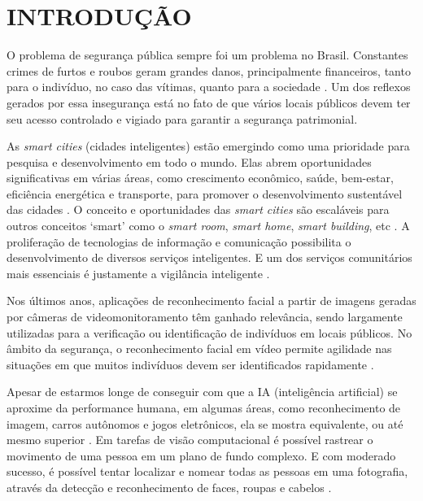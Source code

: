 \chapter{\MakeUppercase{Introdução}}
\label{chap:intro}
\thispagestyle{plain}

\vspace{-3em} %

O problema de segurança pública sempre foi um problema no Brasil. Constantes crimes de furtos e roubos geram grandes danos, principalmente financeiros, tanto para o indivíduo, no caso das vítimas, quanto para a sociedade \cite{Cerqueira2007, G12013}. Um dos reflexos gerados por essa insegurança está no fato de que vários locais públicos devem ter seu acesso controlado e vigiado para garantir a segurança patrimonial.

As \textit{smart cities} (cidades inteligentes) estão emergindo como uma prioridade para pesquisa e desenvolvimento em todo o mundo. Elas abrem oportunidades significativas em várias áreas, como crescimento econômico, saúde, bem-estar, eficiência energética e transporte, para promover o desenvolvimento sustentável das cidades \cite{Song2017}. O conceito e oportunidades das \textit{smart cities} são escaláveis para outros conceitos ‘smart’ como o \textit{smart room}, \textit{smart home}, \textit{smart building}, etc \cite{Pacheco2018}. A proliferação de tecnologias de informação e comunicação possibilita o desenvolvimento de diversos serviços inteligentes. E um dos serviços comunitários mais essenciais é justamente a vigilância inteligente \cite{Chen2016, Nikouei2018}.

Nos últimos anos, aplicações de reconhecimento facial a partir de imagens geradas por câmeras de videomonitoramento têm ganhado relevância, sendo largamente utilizadas para a verificação ou identificação de indivíduos em locais públicos. No âmbito da segurança, o reconhecimento facial em vídeo permite agilidade nas situações em que muitos indivíduos devem ser identificados rapidamente \cite{Quirita2014}.

Apesar de estarmos longe de conseguir com que a IA (inteligência artificial) se aproxime da performance humana, em algumas áreas, como reconhecimento de imagem, carros autônomos e jogos eletrônicos, ela se mostra equivalente, ou até mesmo superior \cite{Aggarwal2018}. Em tarefas de visão computacional é possível rastrear o movimento de uma pessoa em um plano de fundo complexo. E com moderado sucesso, é possível tentar localizar e nomear todas as pessoas em uma fotografia, através da detecção e reconhecimento de faces, roupas e cabelos \cite{Szeliski2011}.

